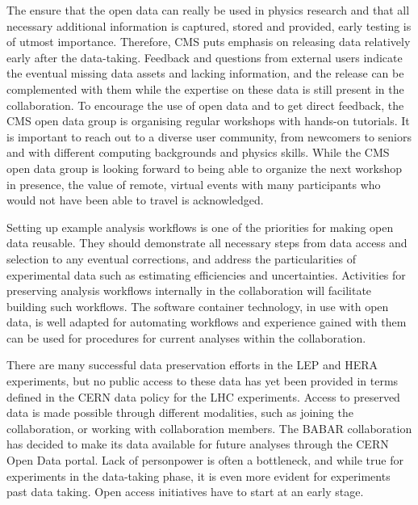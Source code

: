 \documentclass[11pt]{article}
\begin{document}

The ensure that the open data can really be used in physics research and that all necessary additional information is captured, stored and provided, early testing is of utmost importance. Therefore, CMS puts emphasis on releasing data relatively early after the data-taking. Feedback and questions from external users indicate the eventual missing data assets and lacking information, and the release can be complemented with them while the expertise on these data is still present in the collaboration. To encourage the use of open data and to get direct feedback, the CMS open data group is organising regular workshops with hands-on tutorials. It is important to reach out to a diverse user community, from newcomers to seniors and with different computing backgrounds and physics skills. While the CMS open data group is looking forward to being able to organize the next workshop in presence, the value of remote, virtual events with many participants who would not have been able to travel is acknowledged.

Setting up example analysis workflows is one of the priorities for making open data reusable. They should demonstrate all necessary steps from data access and selection to any eventual corrections, and address the particularities of experimental data such as estimating efficiencies and uncertainties. Activities for preserving analysis workflows internally in the collaboration will facilitate building such workflows. The software container technology, in use with open data, is well adapted for automating workflows and experience gained with them can be used for procedures for current analyses within the collaboration.


There are many successful data preservation efforts in the LEP and HERA experiments, but no public access to these data has yet been provided in terms defined in the CERN data policy for the LHC experiments. Access to preserved data is made possible through different modalities, such as joining the collaboration, or working with collaboration members. The BABAR collaboration has decided to make its data available for future analyses through the CERN Open Data portal. Lack of personpower is often a bottleneck, and while true for experiments in the data-taking phase, it is even more evident for experiments past data taking. Open access initiatives have to start at an early stage.
\end{document}
